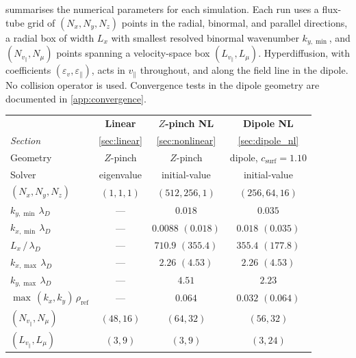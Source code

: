 \documentclass{jpp}
\newcommand{\vpar}{v_\parallel}
\newcommand{\lambdaD}{\lambda_D}
\begin{document}
 summarises the numerical parameters for each simulation. Each run uses a flux-tube grid of $(N_x, N_y, N_z)$ points in the radial, binormal, and parallel directions, a radial box of width $L_x$ with smallest resolved binormal wavenumber $k_{y,\min}$, and $(N_{\vpar}, N_\mu)$ points spanning a velocity-space box $(L_{\vpar}, L_\mu)$. Hyperdiffusion, with coefficients $(\varepsilon_v, \varepsilon_\parallel)$, acts in $\vpar$ throughout, and along the field line in the dipole. No collision operator is used. Convergence tests in the dipole geometry are documented in \cref{app:convergence}.
\begin{table}
\centering
\renewcommand{\arraystretch}{1.15}
\begin{tabular}{lccc}
\hline
                                               & \textbf{Linear} & \textbf{$Z$-pinch NL} & \textbf{Dipole NL} \\
\textit{Section}                               & \cref{sec:linear} & \cref{sec:nonlinear} & \cref{sec:dipole_nl} \\
\hline
Geometry                                       & $Z$-pinch     & $Z$-pinch         & dipole, $c_\mathrm{surf}=1.10$ \\
Solver                                         & eigenvalue  & initial-value   & initial-value \\
$(N_x, N_y, N_z)$                              & $(1,1,1)$   & $(512, 256, 1)$ & $(256, 64, 16)$ \\
$k_{y,\min}\,\lambdaD$                         & ---         & $0.018$         & $0.035$       \\
$k_{x,\min}\,\lambdaD$                         & ---         & $0.0088$ $(0.018)$ & $0.018$ $(0.035)$ \\
$L_x \,/\, \lambdaD$                           & ---         & $710.9$ $(355.4)$ & $355.4$ $(177.8)$ \\
$k_{x,\max}\,\lambdaD$                         & ---         & $2.26$ $(4.53)$ & $2.26$ $(4.53)$ \\
$k_{y,\max}\,\lambdaD$                         & ---         & $4.51$          & $2.23$        \\
$\max\,(k_x, k_y)\,\rho_\mathrm{ref}$          & ---         & $0.064$         & $0.032$ $(0.064)$ \\
$(N_{\vpar}, N_\mu)$                           & $(48, 16)$  & $(64, 32)$      & $(56, 32)$    \\
$(L_{\vpar}, L_\mu)$                           & $(3, 9)$    & $(3, 9)$        & $(3, 24)$     \\

\end{tabular}
\end{table}
\end{document}
